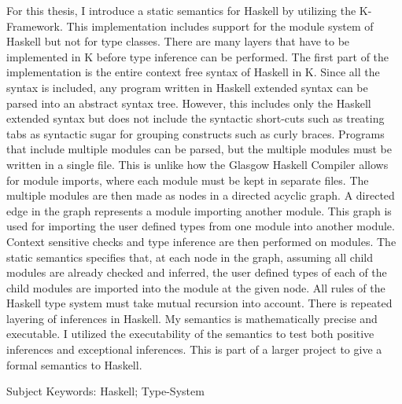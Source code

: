 For this thesis, I introduce a static semantics for Haskell by utilizing the K-Framework. This implementation includes support for the module system of Haskell but not for type classes. There are many layers that have to be implemented in K before type inference can be performed. The first part of the implementation is the entire context free syntax of Haskell in K. Since all the syntax is included, any program written in Haskell extended syntax can be parsed into an abstract syntax tree. However, this includes only the Haskell extended syntax
but does not include the syntactic short-cuts such as treating tabs as syntactic sugar for grouping constructs such as curly braces. Programs that include multiple modules can be parsed, but the multiple modules must be written in a single file. This is unlike how the Glasgow Haskell Compiler allows for module imports, where each module must be kept in separate files. The multiple modules are then made as nodes in a directed acyclic graph. A directed edge in the graph represents a module importing another module. This graph is used for importing the user defined types from one module into another module. Context sensitive checks and type inference are then performed on modules. The static semantics specifies that, at each node in the graph, assuming all child modules are already checked and inferred, the user defined types of each of the child modules are imported into the module at the given node. All rules of the Haskell type system must take mutual recursion into account. There is repeated layering of inferences in Haskell. My semantics is mathematically precise and executable. I utilized the executability of the semantics to test both positive inferences and exceptional inferences. This is part of a larger project to give a formal semantics to Haskell.

Subject Keywords: Haskell; Type-System
